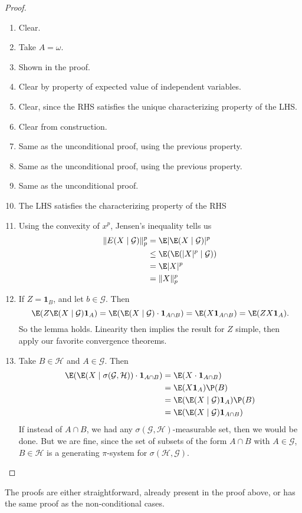 \documentclass[a4paper]{article}
\begin{document}
\begin{proof}
  \begin{enumerate} %
    \item Clear.
    \item Take $A = \omega$.
    \item Shown in the proof.
    \item Clear by property of expected value of independent variables.
    \item Clear, since the RHS satisfies the unique characterizing property of the LHS.
    \item Clear from construction.
    \item Same as the unconditional proof, using the previous property.
    \item Same as the unconditional proof, using the previous property.
    \item Same as the unconditional proof.
    \item The LHS satisfies the characterizing property of the RHS
    \item Using the convexity of $x^p$, Jensen's inequality tells us
      \begin{align*}
        \|E(X \mid \mathcal{G})\|_p^p &= \E |\E(X \mid \mathcal{G})|^p\\
        &\leq \E (\E (|X|^p \mid \mathcal{G}))\\
        &= \E |X|^p\\
        &= \|X\|_p^p
      \end{align*}
    \item If $Z = \mathbf{1}_B$, and let $b \in \mathcal{G}$. Then
      \[
        \E(Z \E(X \mid \mathcal{G}) \mathbf{1}_A) = \E (\E (X \mid \mathcal{G}) \cdot \mathbf{1}_{A \cap B}) = \E(X \mathbf{1}_{A \cap B}) = \E(Z X \mathbf{1}_A).
      \]
      So the lemma holds. Linearity then implies the result for $Z$ simple, then apply our favorite convergence theorems.
    \item Take $B \in \mathcal{H}$ and $A \in \mathcal{G}$. Then
      \begin{align*}
        \E(\E(X \mid \sigma(\mathcal{G}, \mathcal{H}))\cdot \mathbf{1}_{A \cap B}) &= \E(X \cdot \mathbf{1}_{A \cap B})\\
        &= \E(X \mathbf{1}_A) \P(B)\\
        &= \E(\E(X \mid \mathcal{G}) \mathbf{1}_A) \P(B)\\
        &= \E(\E(X \mid \mathcal{G}) \mathbf{1}_{A \cap B})
      \end{align*}
      If instead of $A \cap B$, we had any $\sigma(\mathcal{G}, \mathcal{H})$-measurable set, then we would be done. But we are fine, since the set of subsets of the form $A \cap B$ with $A \in \mathcal{G}$, $B \in \mathcal{H}$ is a generating $\pi$-system for $\sigma(\mathcal{H}, \mathcal{G})$.
  \end{enumerate}
\end{proof}
The proofs are either straightforward, already present in the proof above, or has the same proof as the non-conditional cases.
\end{document}
